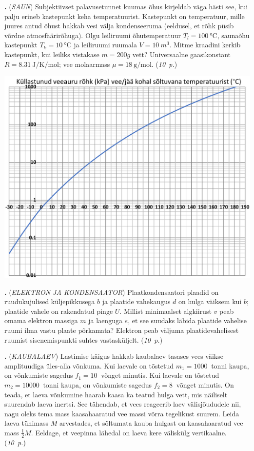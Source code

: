 \documentclass[11pt,a5paper]{article}
\newcommand{\numb}[1]{\vspace{5pt}\textbf{\large #1}}
\newcommand{\nimi}[1]{(\textsl{\small #1})}
\newcommand{\punktid}[1]{(\emph{#1~p.})}
\newcounter{ylesanne}
\newcommand{\yl}[1]{\addtocounter{ylesanne}{1}\numb{\theylesanne.} \nimi{#1} \newblock{}}
\newcommand{\autor}[1]{}%
\begin{document}
\newpage


\yl{SAUN}
Subjektiivset palavusetunnet kuumas õhus kirjeldab väga hästi see, kui palju erineb kastepunkt keha temperatuurist. Kastepunkt on temperatuur, mille juures antud õhust hakkab vesi välja kondenseeruma (eeldusel, et rõhk püsib võrdne atmosfäärirõhuga). Olgu leiliruumi õhutemperatuur $T_l=\SI{100}{\celsius}$, saunaõhu kastepunkt $T_k=\SI{10}{\celsius}$ ja leiliruumi ruumala $V=\SI{10}{m^3}$. Mitme kraadini kerkib kastepunkt, kui leiliks vistakase $m=\SI{200}g$ vett? Universaalne gaasikonstant $R=\SI{8.31}{\joule\per\kelvin\per\mole}$; vee molaarmass $\mu=\SI{18}{\gram \per \mole}$.
\punktid{10} \autor{Jaan Kalda}
\begin{center}
    \includegraphics[width=\textwidth]{veeaur_.pdf}
\end{center}



\yl{ELEKTRON JA KONDENSAATOR} Plaatkondensaatori plaadid on ruudukujulised küljepikkusega $b$ ja plaatide vahekaugus $d$ on hulga väiksem kui $b$; plaatide vahele on rakendatud pinge $U$. Millist minimaalset algkiirust $v$ peab omama elektron massiga $m$ ja laenguga $e$, et see suudaks läbida plaatide vahelise ruumi ilma vastu plaate põrkamata? Elektron peab väljuma plaatidevahelisest ruumist sisenemispunkti suhtes vastasküljelt.
\punktid{10} \autor{Jaan Kalda}

\newpage

\yl{KAUBALAEV} Lastimise käigus hakkab kaubalaev tasases vees väikse amplituudiga üles-alla võnkuma. Kui laevale on tõstetud $m_1 = \SI{1000}{}$ tonni kaupa, on võnkumiste sagedus $f_1 = \SI{10}{}$ võnget minutis. Kui laevale on tõstetud $m_2 = \SI{10000}{}$ tonni kaupa, on võnkumiste sagedus $f_2 = \SI{8}{}$ võnget minutis. On teada, et laeva võnkumine haarab kaasa ka teatud hulga vett, mis näiliselt suurendab laeva inertsi. See tähendab, et vees reageerib laev välisjõududele nii, nagu oleks tema mass kaasahaaratud vee massi võrra tegelikust suurem. Leida laeva tühimass $M$ arvestades, et sõltumata kauba hulgast on kaasahaaratud vee mass $\frac{1}{2}M$. Eeldage, et veepinna lähedal on laeva kere väliskülg vertikaalne.
\punktid{10} \autor{Päivo Simson}
\end{document}
